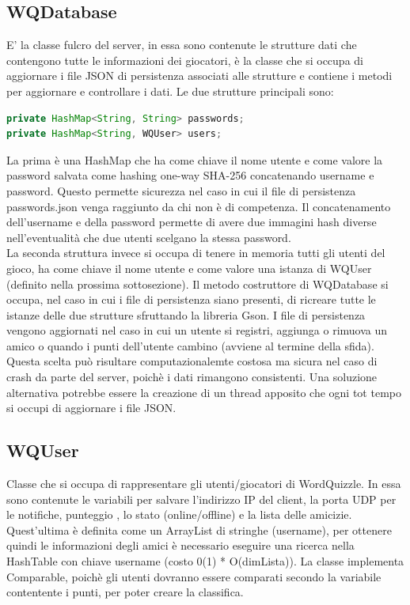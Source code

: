 \documentclass{article}
\begin{document}
\subsection{WQDatabase}
E' la classe fulcro del server, in essa sono contenute le strutture dati che contengono tutte le informazioni dei giocatori, è la classe che si occupa di aggiornare i file JSON di persistenza associati alle strutture e contiene i metodi per aggiornare e controllare i dati. Le due strutture principali sono:
\begin{lstlisting}[language=Java]
private HashMap<String, String> passwords;
private HashMap<String, WQUser> users;
\end{lstlisting}
La prima è una HashMap che ha come chiave il nome utente e come valore la password salvata come hashing one-way SHA-256 concatenando username e password. Questo permette sicurezza nel caso in cui il file di persistenza passwords.json venga raggiunto da chi non è di competenza. Il concatenamento dell'username e della password permette di avere due immagini hash diverse nell'eventualità che due utenti scelgano la stessa password. \\
La seconda struttura invece si occupa di tenere in memoria tutti gli utenti del gioco, ha come chiave il nome utente e come valore una istanza di WQUser (definito nella prossima sottosezione). 
Il metodo costruttore di WQDatabase si occupa, nel caso in cui i file di persistenza siano presenti, di ricreare tutte le istanze delle due strutture sfruttando la libreria Gson. I file di persistenza vengono aggiornati nel caso in cui un utente si registri, aggiunga o rimuova un amico o quando i punti dell'utente cambino (avviene al termine della sfida). Questa scelta può risultare computazionalemte costosa ma sicura nel caso di crash da parte del server, poichè i dati rimangono consistenti. Una soluzione alternativa potrebbe essere la creazione di un thread apposito che ogni tot tempo si occupi di aggiornare i file JSON.

\subsection{WQUser}
Classe che si occupa di rappresentare gli utenti/giocatori di WordQuizzle. In essa sono contenute le variabili per salvare l'indirizzo IP del client, la porta UDP per le notifiche, punteggio , lo stato (online/offline) e la lista delle amicizie. Quest'ultima è definita come un ArrayList di stringhe (username), per ottenere quindi le informazioni degli amici è necessario eseguire una ricerca nella HashTable con chiave username (costo 0(1) * O(dimLista)). La classe implementa Comparable, poichè gli utenti dovranno essere comparati secondo la variabile contentente i punti, per poter creare la classifica.
\end{document}
